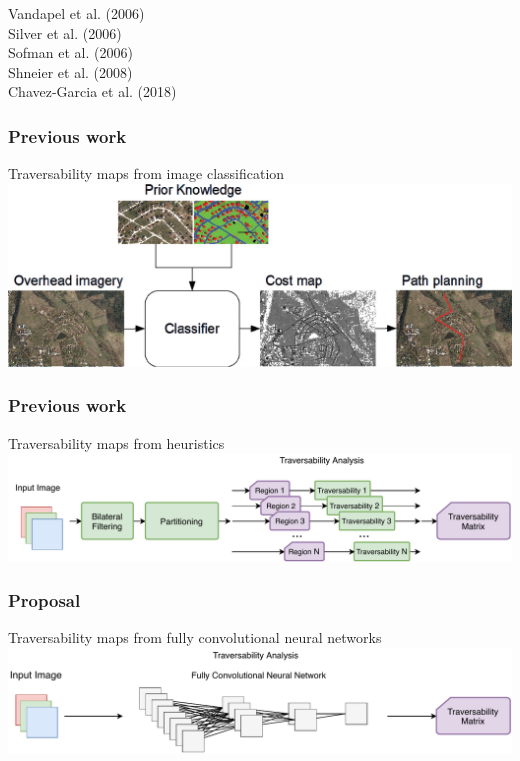 \documentclass[usenames,dvipsnames,10pt]{beamer}
\begin{document}
\begin{frame}
\begin{minipage}[]{0.45\textwidth}
	\centering\tiny{}
	\flushleft
	\scriptsize
	\hspace{0.75cm} Vandapel et al. (2006) \\
	\hspace{0.75cm} Silver et al. (2006) \\
	\hspace{0.75cm} Sofman et al. (2006) \\
	\hspace{0.75cm} Shneier et al. (2008) \\
	\hspace{0.75cm} Chavez-Garcia et al. (2018) \\
\end{minipage}
\end{frame}

\begin{frame}
\frametitle{Previous work}
\centering
Traversability maps from image classification \\[0.5cm]
\includegraphics[width=\textwidth]{graphics/ht.jpg} \\
\centering\tiny{}
\end{frame}

\begin{frame}
\frametitle{Previous work}
\centering
Traversability maps from heuristics \\[0.5cm]
\includegraphics[width=\textwidth]{graphics/eswa-proposal-flowchart.pdf} \\
\centering\tiny{}
\end{frame}

\begin{frame}
\frametitle{Proposal}
\centering
Traversability maps from fully convolutional neural networks \\[0.5cm]
\includegraphics[width=\textwidth]{graphics/proposal-flowchart.pdf}
\end{frame}
\end{document}
